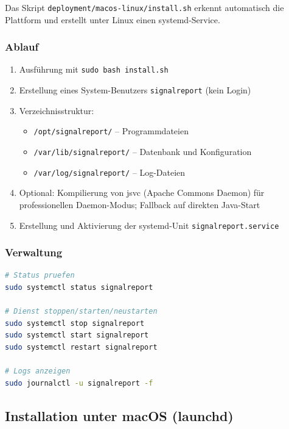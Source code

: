 Das Skript \texttt{deployment/macos-linux/install.sh} erkennt automatisch die Plattform
und erstellt unter Linux einen systemd-Service.

\subsubsection{Ablauf}

\begin{enumerate}
  \item Ausführung mit \texttt{sudo bash install.sh}
  \item Erstellung eines System-Benutzers \texttt{signalreport} (kein Login)
  \item Verzeichnisstruktur:
    \begin{itemize}
      \item \texttt{/opt/signalreport/} -- Programmdateien
      \item \texttt{/var/lib/signalreport/} -- Datenbank und Konfiguration
      \item \texttt{/var/log/signalreport/} -- Log-Dateien
    \end{itemize}
  \item Optional: Kompilierung von jsvc (Apache Commons Daemon) für professionellen
    Daemon-Modus; Fallback auf direkten Java-Start
  \item Erstellung und Aktivierung der systemd-Unit \texttt{signalreport.service}
\end{enumerate}

\subsubsection{Verwaltung}

\begin{lstlisting}[language=bash, caption={systemd-Dienst verwalten}]
# Status pruefen
sudo systemctl status signalreport

# Dienst stoppen/starten/neustarten
sudo systemctl stop signalreport
sudo systemctl start signalreport
sudo systemctl restart signalreport

# Logs anzeigen
sudo journalctl -u signalreport -f
\end{lstlisting}

\subsection{Installation unter macOS (launchd)}
\label{subsec:install-macos}

